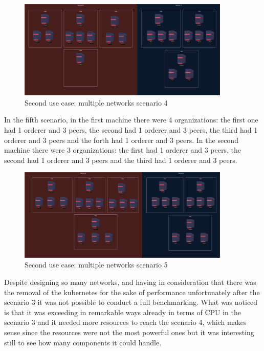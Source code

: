 \begin{figure}[H]
    \centering
    \includegraphics[width=0.9\textwidth]{assets/use-case-2/scenario4.png} %
    \caption{Second use case: multiple networks scenario 4}
    \label{fig:sample-image} 
\end{figure}

In the fifth scenario, in the first machine there were 4 organizations: the first one had 1 orderer and 3 peers, the second had 1 orderer and 3 peers, the third had 1 orderer and 3 peers and the forth had 1 orderer and 3 peers. In the second machine there were 3 organizations: the first had 1 orderer and 3 peers, the second had 1 orderer and 3 peers and the third had 1 orderer and 3 peers.

\begin{figure}[H]
    \centering
    \includegraphics[width=0.9\textwidth]{assets/use-case-2/scenario5.png} %
    \caption{Second use case: multiple networks scenario 5}
    \label{fig:sample-image} 
\end{figure}

Despite designing so many networks, and having in consideration that there was the removal of the kubernetes for the sake of performance unfortunately after the scenario 3 it was not possible to conduct a full benchmarking. What was noticed is that it was exceeding in remarkable ways already in terms of CPU in the scenario 3 and it needed more resources to reach the scenario 4, which makes sense since the resources were not the most powerful ones but it was interesting still to see how many components it could handle.

